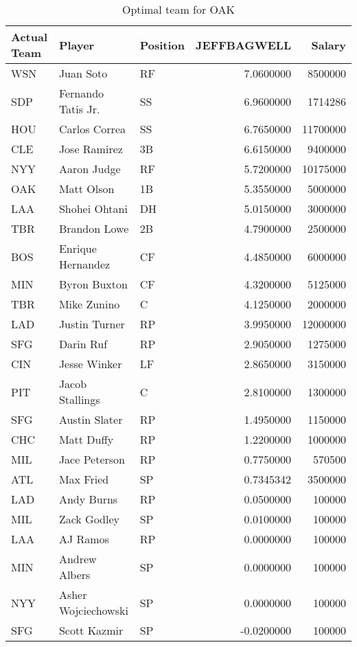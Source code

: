 \begin{table}

\caption{Optimal team for OAK}
\centering
\begin{tabular}[t]{l|l|l|r|r}
\hline
Actual Team & Player & Position & JEFFBAGWELL & Salary\\
\hline
WSN & Juan Soto & RF & 7.0600000 & 8500000\\
\hline
SDP & Fernando Tatis Jr. & SS & 6.9600000 & 1714286\\
\hline
HOU & Carlos Correa & SS & 6.7650000 & 11700000\\
\hline
CLE & Jose Ramirez & 3B & 6.6150000 & 9400000\\
\hline
NYY & Aaron Judge & RF & 5.7200000 & 10175000\\
\hline
OAK & Matt Olson & 1B & 5.3550000 & 5000000\\
\hline
LAA & Shohei Ohtani & DH & 5.0150000 & 3000000\\
\hline
TBR & Brandon Lowe & 2B & 4.7900000 & 2500000\\
\hline
BOS & Enrique Hernandez & CF & 4.4850000 & 6000000\\
\hline
MIN & Byron Buxton & CF & 4.3200000 & 5125000\\
\hline
TBR & Mike Zunino & C & 4.1250000 & 2000000\\
\hline
LAD & Justin Turner & RP & 3.9950000 & 12000000\\
\hline
SFG & Darin Ruf & RP & 2.9050000 & 1275000\\
\hline
CIN & Jesse Winker & LF & 2.8650000 & 3150000\\
\hline
PIT & Jacob Stallings & C & 2.8100000 & 1300000\\
\hline
SFG & Austin Slater & RP & 1.4950000 & 1150000\\
\hline
CHC & Matt Duffy & RP & 1.2200000 & 1000000\\
\hline
MIL & Jace Peterson & RP & 0.7750000 & 570500\\
\hline
ATL & Max Fried & SP & 0.7345342 & 3500000\\
\hline
LAD & Andy Burns & RP & 0.0500000 & 100000\\
\hline
MIL & Zack Godley & SP & 0.0100000 & 100000\\
\hline
LAA & AJ Ramos & RP & 0.0000000 & 100000\\
\hline
MIN & Andrew Albers & SP & 0.0000000 & 100000\\
\hline
NYY & Asher Wojciechowski & SP & 0.0000000 & 100000\\
\hline
SFG & Scott Kazmir & SP & -0.0200000 & 100000\\
\hline
\end{tabular}
\end{table}
